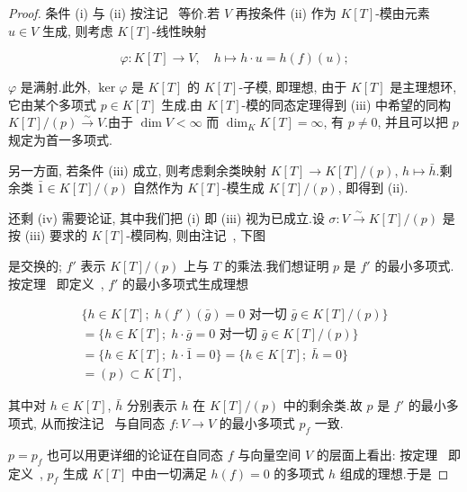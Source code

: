 \begin{proof}
条件 (i) 与 (ii) 按注记~ 等价.若 $V$ 再按条件 (ii) 作为 $K[T]$-模由元素 $u \in V$ 生成, 则考虑 $K[T]$-线性映射

\[
\varphi \colon K[T] \longrightarrow V, \quad h \longmapsto h \cdot u = h(f)(u);\]

$\varphi$ 是满射.此外, $\ker \varphi$ 是 $K[T]$ 的 $K[T]$-子模, 即理想, 由于 $K[T]$ 是主理想环, 它由某个多项式 $p \in K[T]$ 生成.由 $K[T]$-模的同态定理得到 (iii) 中希望的同构 $K[T]/(p) \xrightarrow{\sim} V$.由于 $\dim V < \infty$ 而 $\dim_K K[T] = \infty$, 有 $p \neq 0$, 并且可以把 $p$ 规定为首一多项式.

另一方面, 若条件 (iii) 成立, 则考虑剩余类映射 $K[T] \longrightarrow K[T]/(p)$, $h \longmapsto \bar{h}$.剩余类 $\bar{1} \in K[T]/(p)$ 自然作为 $K[T]$-模生成 $K[T]/(p)$, 即得到 (ii).

还剩 (iv) 需要论证, 其中我们把 (i) 即 (iii) 视为已成立.设 $\sigma \colon V \xrightarrow{\sim} K[T]/(p)$ 是按 (iii) 要求的 $K[T]$-模同构, 则由注记~, 下图

\begin{center}
\end{center}

是交换的; $f'$ 表示 $K[T]/(p)$ 上与 $T$ 的乘法.我们想证明 $p$ 是 $f'$ 的最小多项式.按定理~ 即定义~, $f'$ 的最小多项式生成理想

\[
\begin{array}{l}
\big\{h \in K[T];\; h(f')(\bar{g}) = 0 \text{ 对一切 } \bar{g} \in K[T]/(p)\big\} \\
= \big\{h \in K[T];\; h \cdot \bar{g} = 0 \text{ 对一切 } \bar{g} \in K[T]/(p)\big\} \\
= \big\{h \in K[T];\; h \cdot \bar{1} = 0\big\} = \big\{h \in K[T];\; \bar{h} = 0\big\} \\
= (p) \subset K[T],
\end{array}\]

其中对 $h \in K[T]$, $\bar{h}$ 分别表示 $h$ 在 $K[T]/(p)$ 中的剩余类.故 $p$ 是 $f'$ 的最小多项式, 从而按注记~ 与自同态 $f \colon V \longrightarrow V$ 的最小多项式 $p_f$ 一致.

$p = p_f$ 也可以用更详细的论证在自同态 $f$ 与向量空间 $V$ 的层面上看出: 按定理~ 即定义~, $p_f$ 生成 $K[T]$ 中由一切满足 $h(f) = 0$ 的多项式 $h$ 组成的理想.于是


\end{proof}
